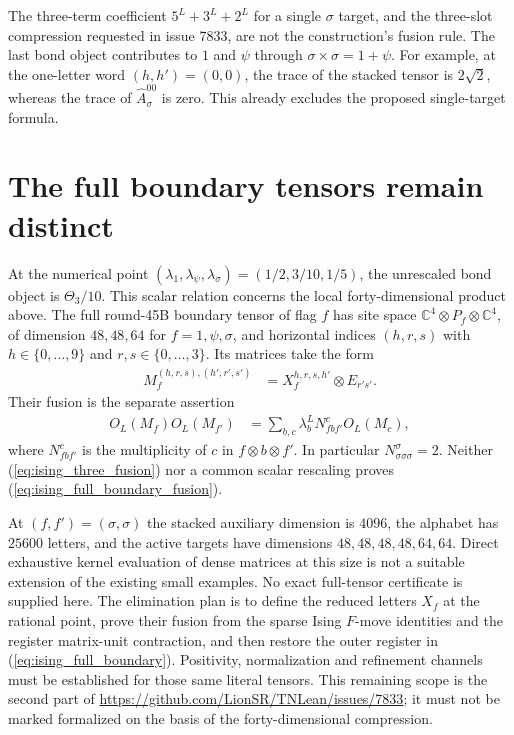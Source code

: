 \documentclass{article}
\begin{document}
The three-term coefficient $5^L+3^L+2^L$ for a single $\sigma$ target,
and the three-slot compression requested in issue 7833, are not the
construction's fusion rule. The last bond object contributes to $1$ and
$\psi$ through $\sigma\times\sigma=1+\psi$. For example, at the one-letter
word $(h,h')=(0,0)$, the trace of the stacked tensor is $2\sqrt2$, whereas
the trace of $\widehat A_\sigma^{00}$ is zero. This already excludes the
proposed single-target formula.

\section{The full boundary tensors remain distinct}

At the numerical point $(\lambda_1,\lambda_\psi,\lambda_\sigma)
=(1/2,3/10,1/5)$, the unrescaled bond object is $\Theta_3/10$.
This scalar relation concerns the local forty-dimensional product above.
The full round-45B boundary tensor of flag $f$ has site space
$\mathbb C^4\otimes P_f\otimes\mathbb C^4$, of dimension
$48,48,64$ for $f=1,\psi,\sigma$, and horizontal indices
$(h,r,s)$ with $h\in\{0,\ldots,9\}$ and $r,s\in\{0,\ldots,3\}$.
Its matrices take the form
\begin{align}
 M_f^{(h,r,s),(h',r',s')}
 &=X_f^{h,r,s,h'}\otimes E_{r's'}.
 \label{eq:ising_full_boundary}
\end{align}
Their fusion is the separate assertion
\begin{align}
 O_L(M_f)O_L(M_{f'})
 &=\sum_{b,c}\lambda_b^L N^c_{fbf'}O_L(M_c),
 \label{eq:ising_full_boundary_fusion}
\end{align}
where $N^c_{fbf'}$ is the multiplicity of $c$ in $f\otimes b\otimes f'$.
In particular $N^\sigma_{\sigma\sigma\sigma}=2$.
Neither (\ref{eq:ising_three_fusion}) nor a common scalar rescaling proves
(\ref{eq:ising_full_boundary_fusion}).

At $(f,f')=(\sigma,\sigma)$ the stacked auxiliary dimension is $4096$,
the alphabet has $25600$ letters, and the active targets have dimensions
$48,48,48,48,64,64$. Direct exhaustive kernel evaluation of dense matrices
at this size is not a suitable extension of the existing small examples.
No exact full-tensor certificate is supplied here. The elimination plan is
to define the reduced letters $X_f$ at the rational point, prove their
fusion from the sparse Ising $F$-move identities and the register matrix-unit
contraction, and then restore the outer register in
(\ref{eq:ising_full_boundary}). Positivity, normalization and refinement
channels must be established for those same literal tensors.
This remaining scope is the second part of
\url{https://github.com/LionSR/TNLean/issues/7833}; it must not be marked
formalized on the basis of the forty-dimensional compression.
\end{document}
